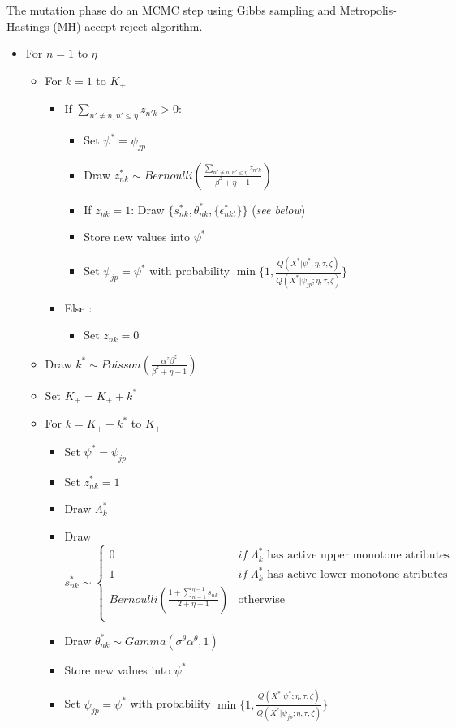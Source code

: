 \documentclass[12pt]{article}
\newcounter{thm}[section]
\begin{document}
The mutation phase do an MCMC step using Gibbs sampling and Metropolis-Hastings (MH) accept-reject algorithm.

\begin{itemize}
	\item For $n=1$ to $\eta$
	\begin{itemize}
		\item For $k=1$ to $K_+$
		\begin{itemize}
			\item If $\sum_{n' \neq n, n'\leq\eta} z_{n'k} > 0 $:
			\begin{itemize}
				\item Set $\psi^* = \psi_{jp}$
				\item Draw $z^*_{nk} \sim Bernoulli(\frac{\sum_{n' \neq n, n'\leq\eta} z_{n'k}}{\beta^z + \eta - 1})$
				\item If $z_{nk} = 1$: Draw $\{s^*_{nk},\theta^*_{nk},\{\epsilon^*_{nkt}\}\}$ (\textit{see below})
				\item Store new values into $\psi^*$
				\item Set $\psi_{jp} = \psi^*$ with probability $\min\{1, \frac{ Q(X^*|\psi^*;\eta,\tau,\zeta) }{ Q(X^*|\psi_{jp};\eta,\tau,\zeta)} \}$
			\end{itemize}
			\item Else :
			\begin{itemize}
				\item Set $z_{nk}=0$
			\end{itemize}
		\end{itemize}
		\item Draw $k^* \sim Poisson(\frac{\alpha^z \beta^z}{\beta^z + \eta - 1})$
		\item Set $K_+ = K_+ + k^*$
		\item For $k=K_+ - k^*$ to $K_+$
		\begin{itemize}
			\item Set $\psi^* = \psi_{jp}$
			\item Set $z^*_{n k} = 1$
			\item Draw $\Lambda^*_k$
			\item Draw $s^*_{n k} \sim \left\{ \begin{array}{cl}
			0 & if \; \Lambda^*_k \text{ has active upper monotone atributes}\\
			1 & if \; \Lambda^*_k \text{ has active lower monotone atributes}\\
			Bernoulli(\frac{1 + \sum_{n=1}^{\eta-1} s_{nk}}{2+\eta-1}) & \text{otherwise}\\
			\end{array}\right.$
			\item Draw $\theta^*_{n k} \sim Gamma(\sigma^\theta \alpha^\theta,1)$
			\item Store new values into $\psi^*$
			\item Set $\psi_{jp} = \psi^*$ with probability $\min\{1, \frac{ Q(X^*|\psi^*;\eta,\tau,\zeta) }{ Q(X^*|\psi_{jp};\eta,\tau,\zeta)} \}$
		\end{itemize}
	\end{itemize}
	

\end{itemize}
\end{document}
